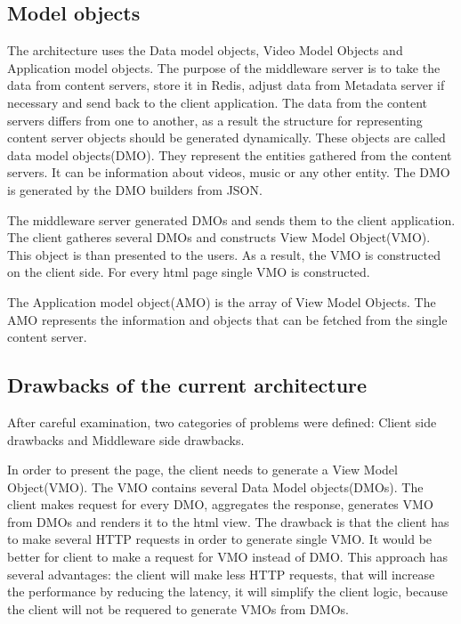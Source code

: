 \subsection{Model objects}

The architecture uses the Data model objects, Video Model Objects and Application model objects.
The purpose of the middleware server is to take the data from content servers, store it in Redis, adjust data from Metadata server if necessary and send back to the client application. The data from the content servers differs from one to another, as a result the structure for representing content server objects should be generated dynamically. These objects are called data model objects(DMO). They represent the entities gathered from the content servers. It can be information about videos, music or any other entity. The DMO is generated by the DMO builders from JSON.

The middleware server generated DMOs and sends them to the client application. The client gatheres several DMOs and constructs View Model Object(VMO). This object is than presented to the users. As a result, the VMO is constructed on the client side. For every html page single VMO is constructed. 

The Application model object(AMO) is the array of View Model Objects. The AMO represents the information and objects that can be fetched from the single content server.

\subsection{Drawbacks of the current architecture}

After careful examination, two categories of problems were defined: Client side drawbacks and Middleware side drawbacks. 

In order to present the page, the client needs to generate a View Model Object(VMO). The VMO contains several Data Model objects(DMOs). The client makes request for every DMO, aggregates the response, generates VMO from DMOs and renders it to the html view. The drawback is that the client has to make several HTTP requests in order to generate single VMO. It would be better for client to make a request for VMO instead of DMO. This approach has several advantages: the client will make less HTTP requests, that will increase the performance by reducing the latency, it will simplify the client logic, because the client will not be requered to generate VMOs from DMOs. 


